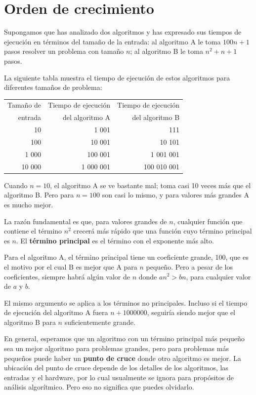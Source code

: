 \documentclass[10pt]{book}
\begin{document}
\section{Orden de crecimiento}

Supongamos que has analizado dos algoritmos y has expresado
sus tiempos de ejecución en términos del tamaño de la entrada:
al algoritmo A le toma $100n+1$ pasos resolver un problema con
tamaño $n$; al algoritmo B le toma $n^2 + n + 1$ pasos.

La siguiente tabla muestra el tiempo de ejecución de estos algoritmos
para diferentes tamaños de problema:

\begin{tabular}{|r|r|r|}
\hline
Tamaño de & Tiempo de ejecución & Tiempo de ejecución \\
entrada   & del algoritmo A     & del algoritmo B \\
\hline
10        &   1 001             & 111         \\
100       &   10 001            & 10 101         \\
1 000     &   100 001           & 1 001 001         \\
10 000    &   1 000 001         & 100 010 001         \\
\hline
\end{tabular}

Cuando $n=10$, el algoritmo A se ve bastante mal; toma casi 10 veces
más que el algoritmo B.  Pero para $n=100$ son casi lo mismo, y
para valores más grandes A es mucho mejor.

La razón fundamental es que, para valores grandes de $n$, cualquier función
que contiene el término $n^2$ crecerá más rápido que una función cuyo
término principal es $n$.  El {\bf término principal} es el término con el
exponente más alto.

Para el algoritmo A, el término principal tiene un coeficiente grande, 100, que
es el motivo por el cual B es mejor que A para $n$ pequeño.  Pero a pesar de los
coeficientes, siempre habrá algún valor de $n$ donde
$a n^2 > b n$, para cualquier valor de $a$ y $b$.

El mismo argumento se aplica a los términos no principales.  Incluso si el tiempo
de ejecución del algoritmo A fuera $n+1000000$, seguiría siendo mejor que el
algoritmo B para $n$ suficientemente grande.

En general, esperamos que un algoritmo con un término principal más pequeño sea un
mejor algoritmo para problemas grandes, pero para problemas más pequeños puede
haber un {\bf punto de cruce} donde otro algoritmo es mejor.  La
ubicación del punto de cruce depende de los detalles de los
algoritmos, las entradas y el hardware, por lo cual usualmente se ignora para
propósitos de análisis algorítmico.  Pero eso no significa que puedes
olvidarlo.
\end{document}
